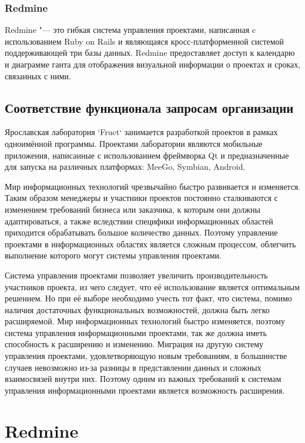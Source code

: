 \subsubsection{Redmine}
Redmine "--- это гибкая система управления проектами, написанная c
использованием Ruby on Rails и являющаяся кросс-платформенной системой
поддерживающей три базы данных. Redmine предоставляет доступ к календарю и
диаграмме ганта для отображения визуальной информации о проектах и сроках,
связанных с ними.

\subsection{Соответствие функционала запросам организации}
Ярославская лаборатория `Fruct` занимается разработкой проектов в рамках
одноимённой программы. Проектами лаборатории являются мобильные приложения,
написанные с использованием фреймворка Qt и предназначенные для запуска на
различных платформах: MeeGo, Symbian, Android.

Мир информационных технологий чрезвычайно быстро развивается и изменяется.
Таким образом менеджеры и участники проектов постоянно сталкиваются с
изменением требований бизнеса или заказчика, к которым они должны
адаптироваться, а также вследствии специфики информационных областей приходится
обрабатывать большое количество данных. Поэтому управление проектами в
информационных областях является сложным процессом, облегчить выполнение
которого могут системы управления проектами.

Система управления проектами позволяет увеличить производительность участников
проекта, из чего следует, что её использование является оптимальным решением.
Но при её выборе необходимо учесть тот факт, что система, помимо наличия
достаточных функциональных возможностей, должна быть легко расширяемой.
Мир информационных технологий быстро изменяется, поэтому система управления
информационными проектами, так же должна иметь способность к расширению и
изменению. Миграция на другую систему управления проектами, удовлетворяющую
новым требованиям, в большинстве случаев невозможно из-за разницы в
представлении данных и сложных взаимосвязей внутри них. Поэтому одним из важных
требований к системам управления информационными проектами является возможность
расширения.

\section{Redmine}


